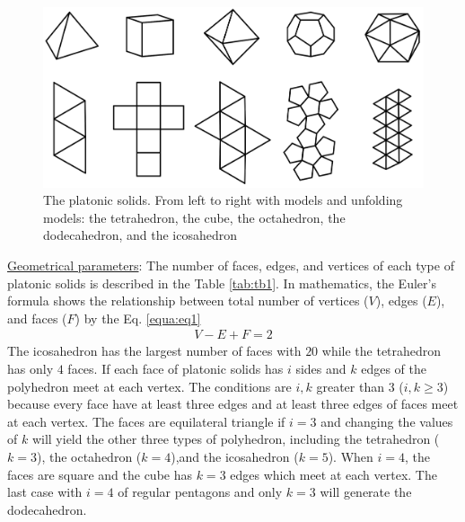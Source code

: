\begin{figure}[h]
\centering
	\includegraphics[width=1\textwidth]{image/5Platonic1.png}
	\caption{The platonic solids. From left to right with models and unfolding models: the tetrahedron, the cube, the octahedron, the dodecahedron, and the icosahedron}
	\label{fig:platonicSolids}
\end{figure}
%
% 
%
%
%
\noindent \uline{Geometrical parameters}: 
The number of faces, edges, and vertices of each type of platonic solids is described in the Table \ref{tab:tb1}. 
In mathematics, the Euler's formula shows the relationship between total number of vertices ($V$), edges ($E$), and faces ($F$) by the Eq. \ref{equa:eq1}
%
\begin{equation} 
\label{equa:eq1}
\begin{split}
V-E+F=2
\end{split}
\end{equation}
% 
The icosahedron has the largest number of faces with $20$ while the tetrahedron has only $4$ faces. 
If each face of platonic solids has $i$ sides and $k$ edges of the polyhedron meet at each vertex.
The conditions are $i,k$ greater than $3$ ($i,k\geq3$) because every face have at least three edges and at least three edges of faces meet at each vertex.
The faces are equilateral triangle if $i=3$ and changing the values of $k$ will yield the other three types of polyhedron, including the tetrahedron ($k=3$), the octahedron ($k=4$),and the icosahedron ($k=5$). When $i=4$, the faces are square and the cube has $k=3$ edges which meet at each vertex. The last case with $i=4$ of regular pentagons and only $k=3$ will generate the dodecahedron. \\

